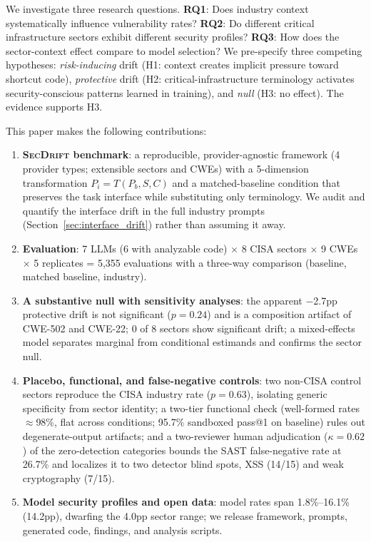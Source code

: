 \documentclass[sigconf,review,anonymous]{acmart}
\newcommand{\secdrift}{\textsc{SecDrift}}
\begin{document}
We investigate three research questions. \textbf{RQ1}: Does industry context systematically influence vulnerability rates? \textbf{RQ2}: Do different critical infrastructure sectors exhibit different security profiles? \textbf{RQ3}: How does the sector-context effect compare to model selection? We pre-specify three competing hypotheses: \textit{risk-inducing} drift (H1: context creates implicit pressure toward shortcut code), \textit{protective} drift (H2: critical-infrastructure terminology activates security-conscious patterns learned in training), and \textit{null} (H3: no effect). The evidence supports H3.

This paper makes the following contributions:
\begin{enumerate}
    \item \textbf{\secdrift{} benchmark}: a reproducible, provider-agnostic framework (4 provider types; extensible sectors and CWEs) with a 5-dimension transformation $P_i = T(P_b, S, C)$ and a matched-baseline condition that preserves the task interface while substituting only terminology. We audit and quantify the interface drift in the full industry prompts (Section~\ref{sec:interface_drift}) rather than assuming it away.
    \item \textbf{Evaluation}: 7 LLMs (6 with analyzable code) $\times$ 8 CISA sectors $\times$ 9 CWEs $\times$ 5 replicates = 5,355 evaluations with a three-way comparison (baseline, matched baseline, industry).
    \item \textbf{A substantive null with sensitivity analyses}: the apparent $-$2.7pp protective drift is not significant ($p=0.24$) and is a composition artifact of CWE-502 and CWE-22; 0 of 8 sectors show significant drift; a mixed-effects model separates marginal from conditional estimands and confirms the sector null.
    \item \textbf{Placebo, functional, and false-negative controls}: two non-CISA control sectors reproduce the CISA industry rate ($p=0.63$), isolating generic specificity from sector identity; a two-tier functional check (well-formed rates $\approx$98\%, flat across conditions; 95.7\% sandboxed pass@1 on baseline) rules out degenerate-output artifacts; and a two-reviewer human adjudication ($\kappa=0.62$) of the zero-detection categories bounds the SAST false-negative rate at 26.7\% and localizes it to two detector blind spots, XSS (14/15) and weak cryptography (7/15).
    \item \textbf{Model security profiles and open data}: model rates span 1.8\%--16.1\% (14.2pp), dwarfing the 4.0pp sector range; we release framework, prompts, generated code, findings, and analysis scripts.
\end{enumerate}
\end{document}
